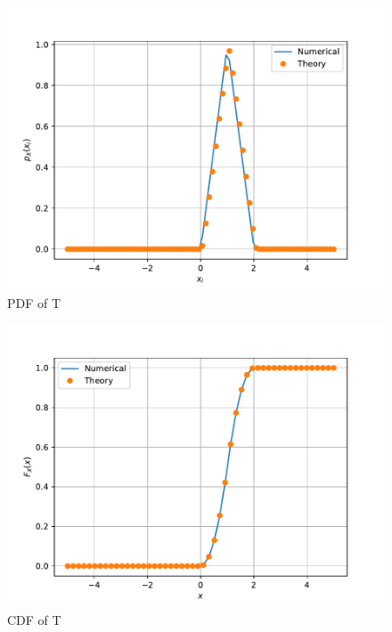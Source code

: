 \documentclass[journal,12pt,twocolumn]{IEEEtran}
\renewcommand\thesection{\arabic{section}}
\begin{document}
\begin{enumerate}[label=\thesection.\arabic*
,ref=\thesection.\theenumi]
\begin{figure}[h]
	\includegraphics[width=\columnwidth]{figs/4/T_pdf.pdf}
	\caption{PDF of T}
	\label{fig:T_pdf}
\end{figure}
	\begin{figure}[h]
		
		\includegraphics[width=\columnwidth]{figs/4/T_cdf.pdf}
		\caption{CDF of T}
		\label{fig:T_cdf}
\end{figure}
\end{enumerate}
\end{document}
